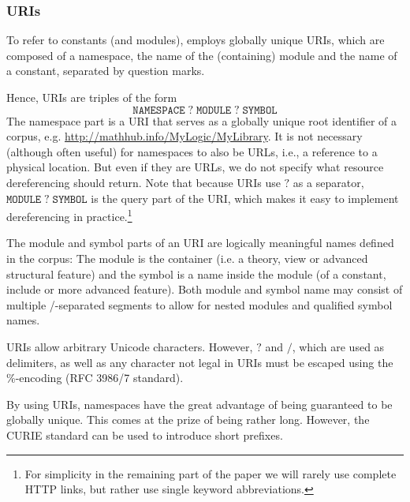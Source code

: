 \subsubsection{URIs}

To refer to constants (and modules), \ommt employs globally unique URIs, which are composed of a namespace, the name of the (containing) module and the name of a constant, separated by question marks.

Hence, \mmt URIs are triples of the form 
 \[\mathtt{NAMESPACE} \;?\; \mathtt{MODULE} \;?\; \mathtt{SYMBOL}\]
 The namespace part is a URI that serves as a globally unique root identifier of a corpus,
 e.g. \url{http://mathhub.info/MyLogic/MyLibrary}. It is not necessary (although often
 useful) for namespaces to also be URLs, i.e., a reference to a physical location.  But
 even if they are URLs, we do not specify what resource dereferencing should return.  Note
 that because \mmt URIs use $?$ as a separator, $\mathtt{MODULE} \;?\; \mathtt{SYMBOL}$ is
 the query part of the URI, which makes it easy to implement dereferencing in practice.\footnote{For simplicity in the remaining part of the paper we will rarely use complete HTTP links, but rather use single keyword abbreviations.}

The module and symbol parts of an \mmt URI are logically meaningful names defined in the corpus: The module is the container (i.e. a theory, view or advanced structural feature) and the symbol is a name inside the module (of a constant, include or more advanced feature).
Both module and symbol name may consist of multiple /-separated segments to allow for nested modules and qualified symbol names. 

\mmt URIs allow arbitrary Unicode characters.  However, $?$ and $/$, which are used as
delimiters, as well as any character not legal in URIs must be escaped using the
\%-encoding (RFC 3986/7 standard).

By using URIs, namespaces have the great advantage of being guaranteed to be globally unique.
This comes at the prize of being rather long.
However, the CURIE standard can be used to introduce short prefixes.

